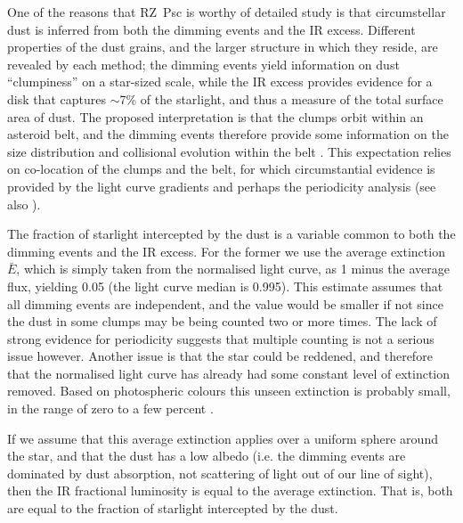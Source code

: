 \documentclass[]{rsos}
\begin{document}
One of the reasons that RZ~Psc is worthy of detailed study is that circumstellar dust is
inferred from both the dimming events and the IR excess. Different properties of the dust
grains, and the larger structure in which they reside, are revealed by each method; the
dimming events yield information on dust ``clumpiness'' on a star-sized scale, while the
IR excess provides evidence for a disk that captures $\sim$7\% of the starlight, and thus
a measure of the total surface area of dust. The proposed interpretation is that the
clumps orbit within an asteroid belt, and the dimming events therefore provide some
information on the size distribution and collisional evolution within the belt
\cite{2013A&A...553L...1D}. This expectation relies on co-location of the clumps and the
belt, for which circumstantial evidence is provided by the light curve gradients and
perhaps the periodicity analysis (see also \cite{2010A&A...524A...8G}).

The fraction of starlight intercepted by the dust is a variable common to both the
dimming events and the IR excess. For the former we use the average extinction $\bar{E}$,
which is simply taken from the normalised light curve, as 1 minus the average flux,
yielding 0.05 (the light curve median is 0.995). This estimate assumes that all dimming
events are independent, and the value would be smaller if not since the dust in some
clumps may be being counted two or more times. The lack of strong evidence for
periodicity suggests that multiple counting is not a serious issue however. Another issue
is that the star could be reddened, and therefore that the normalised light curve has
already had some constant level of extinction removed. Based on photospheric colours this
unseen extinction is probably small, in the range of zero to a few percent
\cite{2000ARep...44..611K}.

If we assume that this average extinction applies over a uniform sphere around the star,
and that the dust has a low albedo (i.e. the dimming events are dominated by dust
absorption, not scattering of light out of our line of sight), then the IR fractional
luminosity is equal to the average extinction. That is, both are equal to the fraction of
starlight intercepted by the dust.
\end{document}
